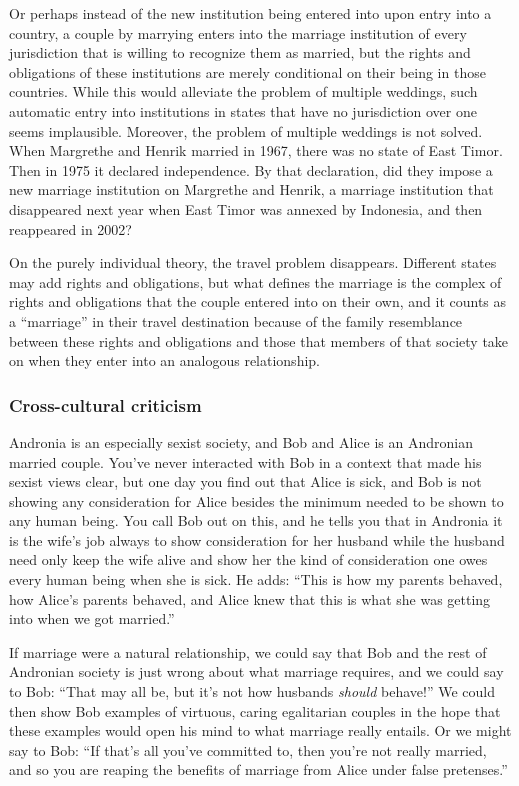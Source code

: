 Or perhaps instead of the new institution being entered into upon entry into a country, a couple by marrying enters into the marriage institution of every
jurisdiction that is willing to recognize them as married, but the rights and obligations of these institutions are merely conditional on their being in
those countries. While this would alleviate the problem of multiple weddings, such automatic entry into institutions in states that have no jurisdiction over one seems implausible.
Moreover, the problem of multiple weddings is not solved. When Margrethe and Henrik married in 1967, there was no state of East Timor. Then in
1975 it declared independence. By that declaration, did they impose a new marriage institution on Margrethe and Henrik, a marriage institution that disappeared
next year when East Timor was annexed by Indonesia, and then reappeared in 2002?

On the purely individual theory, the travel problem disappears. Different states may add rights and obligations, but what defines the marriage is the
complex of rights and obligations that the couple entered into on their own, and it counts as a ``marriage'' in their travel destination because of the
family resemblance between these rights and obligations and those that members of that society take on when they enter into an analogous relationship.

\subsubsection{Cross-cultural criticism}
Andronia is an especially sexist society, and Bob and Alice is an Andronian married couple. You've never interacted with Bob in a context that made his sexist
views clear, but one day you find out that Alice is sick, and Bob is not showing any consideration for Alice besides the minimum needed to be shown to any human being. You
call Bob out on this, and he tells you that in Andronia it is the wife's job always to show consideration for her husband while the husband need only keep the wife alive
and show her the kind of consideration one owes every human being when she is sick. He adds: ``This is how my parents behaved, how Alice's parents behaved, and Alice knew that this is what she was getting into when we got married.''

If marriage were a natural relationship, we could say that Bob and the rest of Andronian society is just wrong about what marriage requires, and we could
say to Bob: ``That may all be, but it's not how husbands \textit{should} behave!'' We could then show Bob examples of virtuous, caring egalitarian couples
in the hope that these examples would open his mind to what marriage really entails. Or we might say to Bob: ``If that's all you've committed to, then
you're not really married, and so you are reaping the benefits of marriage from Alice under false pretenses.''

